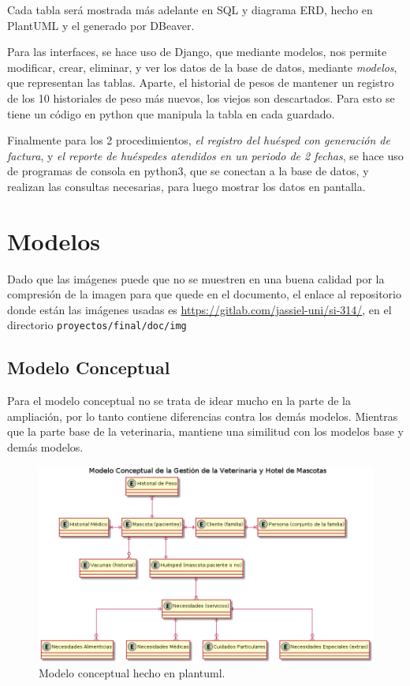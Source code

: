\documentclass[
  12pt,
  hidelinks,
  a4paper,
  headings=standardclasses,
  headings=big,
  spanish
]{scrartcl}
\begin{document}
Cada tabla será mostrada más adelante en SQL y diagrama ERD, hecho en PlantUML y el generado por DBeaver.

Para las interfaces, se hace uso de Django, que mediante modelos, nos permite modificar, crear, eliminar, y ver los datos de la base de datos, mediante \emph{modelos}, que representan las tablas.
Aparte, el historial de pesos de mantener un registro de los 10 historiales de peso más nuevos, los viejos son descartados. Para esto se tiene un código en python que manipula la tabla en cada guardado.

Finalmente para los 2 procedimientos, \emph{el registro del huésped con generación de factura}, y \emph{el reporte de huéspedes atendidos en un periodo de 2 fechas}, se hace uso de programas de consola en python3, que se conectan a la base de datos, y realizan las consultas necesarias, para luego mostrar los datos en pantalla.

\pagebreak
\section{Modelos}

Dado que las imágenes puede que no se muestren en una buena calidad por la compresión de la imagen para que quede en el documento, el enlace al repositorio donde están las imágenes usadas es \url{https://gitlab.com/jassiel-uni/si-314/}, en el directorio \texttt{proyectos/final/doc/img}

\subsection{Modelo Conceptual}

Para el modelo conceptual no se trata de idear mucho en la parte de la ampliación, por lo tanto contiene diferencias contra los demás modelos.
Mientras que la parte base de la veterinaria, mantiene una similitud con los modelos base y demás modelos.

\begin{figure}[H]
  \centering
  \includegraphics[width=1\textwidth]{veterinaria_modelo_conceptual.png}
  \caption{Modelo conceptual hecho en plantuml.}
\end{figure}
\end{document}
